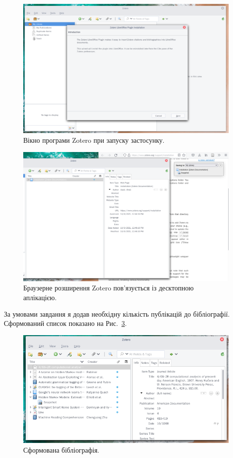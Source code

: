 \documentclass[oneside,14pt,a4paper]{extreport}
\begin{document}
\begin{figure}[H]
    \centering
    \includegraphics[width=.9\textwidth]{imgs/sp2_zotero_app_started.png}
    \caption{Вікно програми Zotero при запуску застосунку.}
    \label{pic:zotero-app-started}
\end{figure}

\begin{figure}[H]
    \centering
    \includegraphics[width=.9\textwidth]{imgs/sp2_zotero_connector.png}
    \caption{Браузерне розширення Zotero пов'язується із десктопною аплікацією.}
    \label{pic:zotero-connector}
\end{figure}

За умовами завдання я додав необхідну кількість публікацій до бібліографії. Сформований список показано на Рис.~\ref{pic:citation-list}.

\begin{figure}[h]
    \centering
    \includegraphics[width=.9\textwidth]{imgs/sp2_citation_list.png}
    \caption{Сформована бібліографія.}
    \label{pic:citation-list}
\end{figure}
\end{document}
